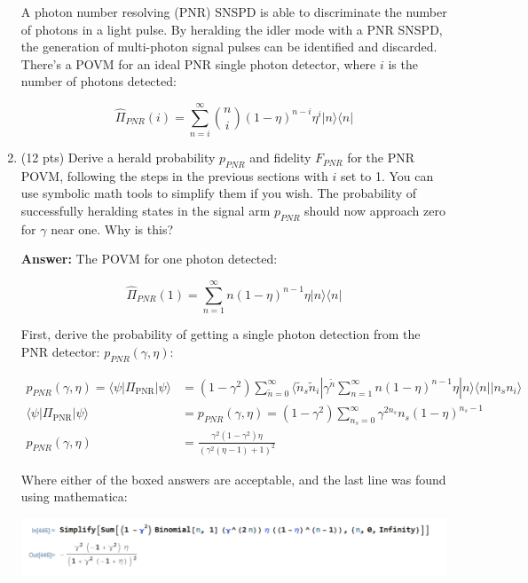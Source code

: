 \documentclass[12pt]{caltech_thesis}
\begin{document}
\begin{enumerate}
  A photon number resolving (PNR) SNSPD is able to discriminate the
  number of photons in a light pulse. By heralding the idler mode with a
  PNR SNSPD, the generation of multi-photon signal pulses can be
  identified and discarded. There's a POVM for an ideal PNR single
  photon detector, where \(i\) is the number of photons detected:

  \[\hat{\Pi}_{PNR}(i)=\sum_{n=i}^{\infty}\binom{n}{i}(1-\eta)^{n-i} \eta^{i}|n\rangle\langle n|\]
\item
  (12 pts) Derive a herald probability \(p_{PNR}\) and fidelity
  \(F_{PNR}\) for the PNR POVM, following the steps in the previous
  sections with \(i\) set to 1. You can use symbolic math tools to
  simplify them if you wish. The probability of successfully heralding
  states in the signal arm \(p_{PNR}\) should now approach zero for
  \(\gamma\) near one. Why is this?

  {\color{midnightblue}  \textbf{Answer:} } {\color{midnightblue} The
  POVM for one photon detected:}

  {\color{midnightblue} 

  \[\hat{\Pi}_{PNR}(1)=\sum_{n=1}^{\infty}n(1-\eta)^{n-1} \eta|n\rangle\langle n|\]

  }

  {\color{midnightblue} First, derive the probability of getting a
  single photon detection from the PNR detector:
  \(p_{PNR}(\gamma, \eta)\):}

  {\color{midnightblue} 

  \[\begin{aligned}
       p_{PNR}(\gamma, \eta) =\langle \psi | \Pi_{\text {PNR}} | \psi \rangle &= (1- \gamma^2) \sum_{\tilde{n}=0}^{\infty} \langle \tilde{n}_s \tilde{n}_i | \gamma^{\tilde{n}} \sum_{n=1}^{\infty}n(1-\eta)^{n-1} \eta|n\rangle\langle n| | n_s n_i \rangle \\
       \langle \psi | \Pi_{\text {PNR}} | \psi \rangle &= p_{PNR}\left(\gamma, \eta\right) =  \boxed{(1-\gamma^2) \sum_{n_s=0}^{\infty} \gamma^{2n_s} n_s(1-\eta)^{n_s-1}}\\
       p_{PNR}\left(\gamma, \eta\right) &=  \boxed{\frac{\gamma ^2 (1 - \gamma ^2) \eta }{(\gamma ^2 (\eta -1)+1)^2}}
   \end{aligned}\]

  }

  {\color{midnightblue} Where either of the boxed answers are
  acceptable, and the last line was found using mathematica:}

  {\color{midnightblue} \includegraphics{chapter_05/figs_05/simplify_ppnr.PNG}}


\end{enumerate}
\end{document}
